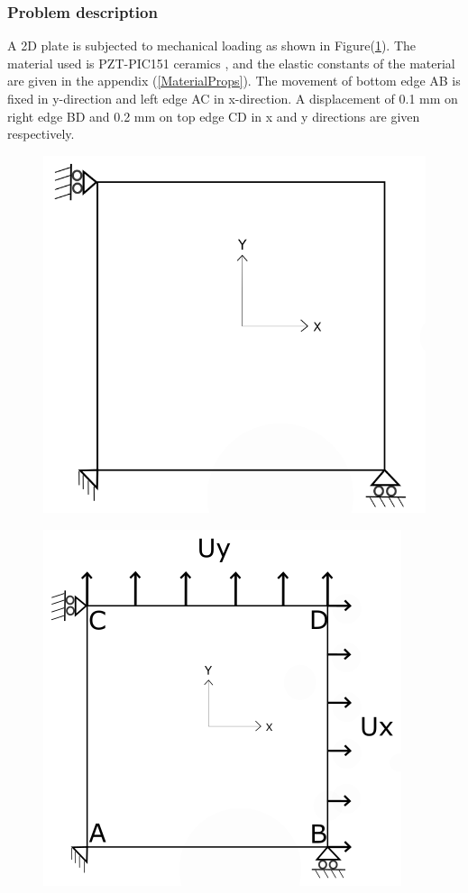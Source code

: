 \documentclass[11pt]{article}
\begin{document}
\subsubsection{Problem description}
A 2D plate is subjected to mechanical loading as shown in Figure(\ref{XYLoading}). The material used is PZT-PIC151 ceramics \cite{kozinov2018simulation}, and the elastic constants of the material are given in the appendix (\ref{MaterialProps}).
The movement of bottom edge AB is fixed in y-direction and left edge AC in x-direction. A displacement of 0.1 mm on right edge BD and 0.2 mm on top edge CD in x and y directions are given respectively.
\begin{figure}[H]
	\centering
	\begin{minipage}{.5\textwidth}
		\centering
		\includegraphics[width=0.8\linewidth]{2DPlate.png}
		\label{2Dplate}
	\end{minipage}%
	\begin{minipage}{.5\textwidth}
		\centering
		\includegraphics[width=0.9\linewidth]{XYLoading.png}
		\label{XYLoading}
	\end{minipage}
\end{figure}
\end{document}
